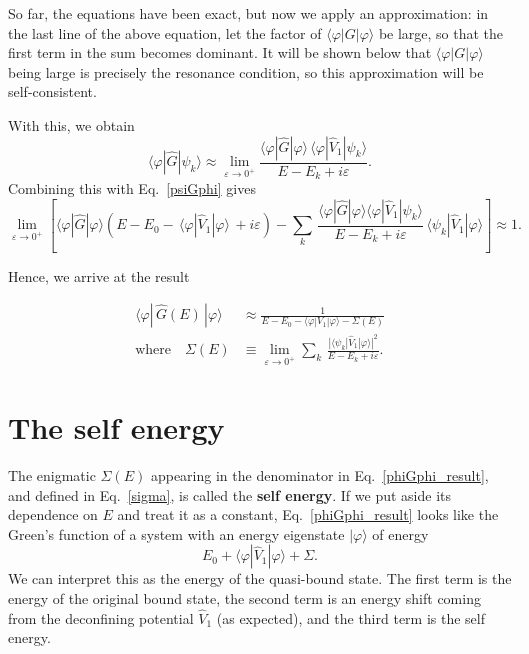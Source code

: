\documentclass[pra,12pt]{revtex4}
\begin{document}
So far, the equations have been exact, but now we apply an
approximation: in the last line of the above equation, let the factor
of $\langle\varphi|G|\varphi\rangle$ be large, so that the first term
in the sum becomes dominant.  It will be shown below that
$\langle\varphi|G|\varphi\rangle$ being large is precisely the
resonance condition, so this approximation will be self-consistent.

With this, we obtain
\begin{equation}
  \langle\varphi|\hat{G}|\psi_k\rangle \approx \lim_{\varepsilon\rightarrow0^+} \frac{\langle\varphi|\hat{G}|\varphi\rangle \, \langle\varphi|\hat{V}_1|\psi_k\rangle}{E-E_k+i\varepsilon}.
  \label{phiGpsi}
\end{equation}
Combining this with Eq.~\eqref{psiGphi} gives
\begin{equation*}
  \lim_{\varepsilon\rightarrow0^+} \left[\langle\varphi|\hat{G}|\varphi\rangle \left(E - E_0 -\, \langle\varphi|\hat{V}_1|\varphi\rangle \, + i\varepsilon\right) - \sum_k\, \frac{\langle\varphi|\hat{G}|\varphi\rangle\langle\varphi|\hat{V}_1|\psi_k\rangle}{E-E_k+i\varepsilon} \, \langle\psi_k| \hat{V}_1|\varphi\rangle\right] \approx 1.
\end{equation*}

Hence, we arrive at the result
\begin{framed}
  \begin{align}
    \langle\varphi|\,\hat{G}(E)\,|\varphi\rangle
    &\approx \frac{1}{\displaystyle E - E_0 - \langle\varphi|V_1|\varphi\rangle - \Sigma(E)}
    \label{phiGphi_result} \\
    \mathrm{where}\quad
    \Sigma(E) &\equiv \lim_{\varepsilon\rightarrow0^+}
    \sum_k \, \frac{\displaystyle| \langle\psi_k| \hat{V}_1|\varphi\rangle|^2}{\displaystyle E-E_k+i\varepsilon}.
    \label{sigma}
  \end{align}
\end{framed}

\section{The self energy}
\label{sec:self_energy}

The enigmatic $\Sigma(E)$ appearing in the denominator in
Eq.~\eqref{phiGphi_result}, and defined in Eq.~\eqref{sigma}, is
called the \textbf{self energy}.  If we put aside its dependence on
$E$ and treat it as a constant, Eq.~\eqref{phiGphi_result} looks like
the Green's function of a system with an energy eigenstate
$|\varphi\rangle$ of energy
\begin{equation*}
  E_0 + \langle\varphi|\hat{V}_1|\varphi\rangle + \Sigma.
\end{equation*}
We can interpret this as the energy of the quasi-bound state.  The
first term is the energy of the original bound state, the second term
is an energy shift coming from the deconfining potential $\hat{V}_1$
(as expected), and the third term is the self energy.
\end{document}
